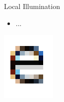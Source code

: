 \documentclass{lug}
\newcommand{\splitslide}[4]{
    \noindent
    \begin{minipage}{#1 \textwidth - #2 }
        #3
    \end{minipage}%
    \hspace{ \dimexpr #2 * 2 \relax }%
    \begin{minipage}{\textwidth - #1 \textwidth - #2 }
        #4
    \end{minipage}
}
\begin{document}
\begin{frame}{Local Illumination}
    \splitslide{0.65}{.7em}{
        \small
        \begin{itemize}
            \item ...
        \end{itemize}
    }{
        \includegraphics[width=\textwidth]{graphics/subpixel_e}
    }
\end{frame}
\end{document}
